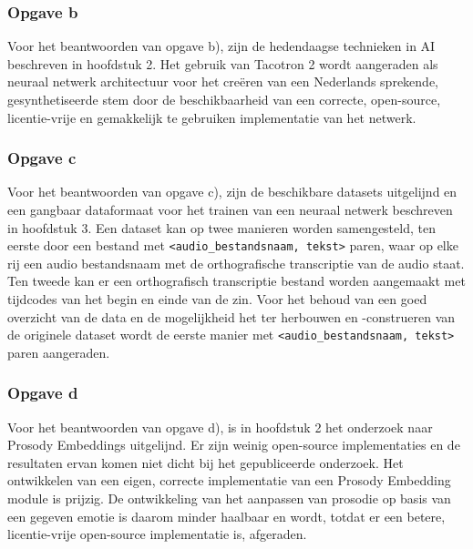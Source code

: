 \subsubsection{Opgave b}
Voor het beantwoorden van opgave b), zijn de hedendaagse technieken in AI beschreven in hoofdstuk 2. Het gebruik van Tacotron 2 wordt aangeraden als neuraal netwerk architectuur voor het creëren van een Nederlands sprekende, gesynthetiseerde stem door de beschikbaarheid van een correcte, open-source, licentie-vrije en gemakkelijk te gebruiken implementatie van het netwerk.

\subsubsection{Opgave c}
Voor het beantwoorden van opgave c), zijn de beschikbare datasets uitgelijnd en een gangbaar dataformaat voor het trainen van een neuraal netwerk beschreven in hoofdstuk 3. Een dataset kan op twee manieren worden samengesteld, ten eerste door een bestand met \texttt{<audio\_bestandsnaam, tekst>} paren, waar op elke rij een audio bestandsnaam met de orthografische transcriptie van de audio staat. Ten tweede kan er een orthografisch transcriptie bestand worden aangemaakt met tijdcodes van het begin en einde van de zin. Voor het behoud van een goed overzicht van de data en de mogelijkheid het ter herbouwen en -construeren van de originele dataset wordt de eerste manier  met \texttt{<audio\_bestandsnaam, tekst>} paren aangeraden.

\subsubsection{Opgave d}
Voor het beantwoorden van opgave d), is in hoofdstuk 2 het onderzoek naar Prosody Embeddings uitgelijnd. Er zijn weinig open-source implementaties en de resultaten ervan komen niet dicht bij het gepubliceerde onderzoek. Het ontwikkelen van een eigen, correcte implementatie van een Prosody Embedding module is prijzig. De ontwikkeling van het aanpassen van prosodie op basis van een gegeven emotie is daarom minder haalbaar en wordt, totdat er een betere, licentie-vrije open-source implementatie is, afgeraden.




